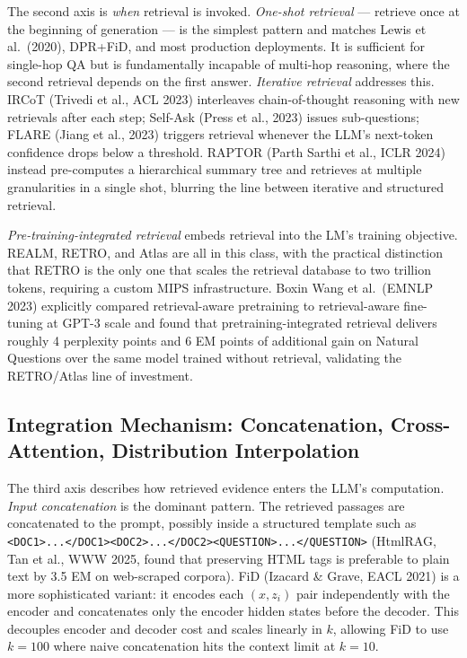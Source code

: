The second axis is \emph{when} retrieval is invoked. \emph{One-shot retrieval} --- retrieve once at the beginning of generation --- is the simplest pattern and matches Lewis et al.~(2020), DPR+FiD, and most production deployments. It is sufficient for single-hop QA but is fundamentally incapable of multi-hop reasoning, where the second retrieval depends on the first answer. \emph{Iterative retrieval} addresses this. IRCoT (Trivedi et al., ACL 2023) interleaves chain-of-thought reasoning with new retrievals after each step; Self-Ask (Press et al., 2023) issues sub-questions; FLARE (Jiang et al., 2023) triggers retrieval whenever the LLM's next-token confidence drops below a threshold. RAPTOR (Parth Sarthi et al., ICLR 2024) instead pre-computes a hierarchical summary tree and retrieves at multiple granularities in a single shot, blurring the line between iterative and structured retrieval.

\emph{Pre-training-integrated retrieval} embeds retrieval into the LM's training objective. REALM, RETRO, and Atlas are all in this class, with the practical distinction that RETRO is the only one that scales the retrieval database to two trillion tokens, requiring a custom MIPS infrastructure. Boxin Wang et al.~(EMNLP 2023) explicitly compared retrieval-aware pretraining to retrieval-aware fine-tuning at GPT-3 scale and found that pretraining-integrated retrieval delivers roughly 4 perplexity points and 6 EM points of additional gain on Natural Questions over the same model trained without retrieval, validating the RETRO/Atlas line of investment.

\subsection{Integration Mechanism: Concatenation, Cross-Attention, Distribution Interpolation}\label{integration-mechanism-concatenation-cross-attention-distribution-interpolation}

The third axis describes how retrieved evidence enters the LLM's computation. \emph{Input concatenation} is the dominant pattern. The retrieved passages are concatenated to the prompt, possibly inside a structured template such as \texttt{\textless{}DOC1\textgreater{}...\textless{}/DOC1\textgreater{}\textless{}DOC2\textgreater{}...\textless{}/DOC2\textgreater{}\textless{}QUESTION\textgreater{}...\textless{}/QUESTION\textgreater{}} (HtmlRAG, Tan et al., WWW 2025, found that preserving HTML tags is preferable to plain text by 3.5 EM on web-scraped corpora). FiD (Izacard \& Grave, EACL 2021) is a more sophisticated variant: it encodes each \((x, z_i)\) pair independently with the encoder and concatenates only the encoder hidden states before the decoder. This decouples encoder and decoder cost and scales linearly in \(k\), allowing FiD to use \(k=100\) where naive concatenation hits the context limit at \(k=10\).

